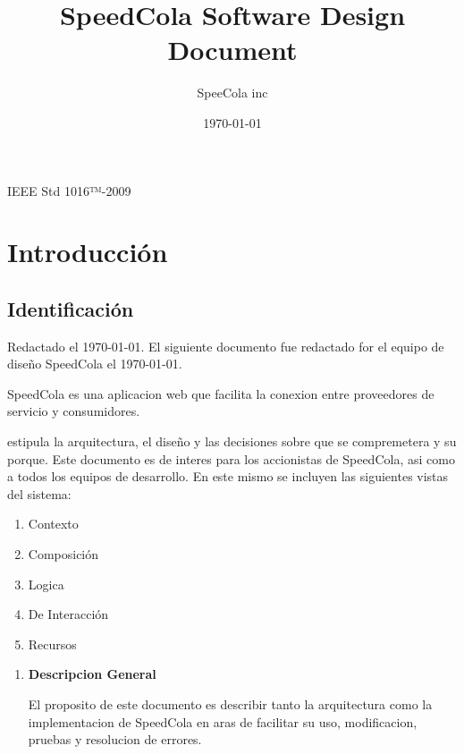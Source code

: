 \documentclass{article}
\title{SpeedCola Software Design Document}
\date{\today}%
\author{SpeeCola inc}%
\begin{document}
\maketitle
IEEE Std 1016™-2009

\newpage
{}

\section{Introducci\'on}
  \subsection{Identificaci\'on}
  Redactado el \today.
  El siguiente documento fue redactado for el equipo de dise\~no SpeedCola el \today . 

  SpeedCola es una aplicacion web que facilita la conexion entre proveedores de servicio y consumidores.

  estipula la arquitectura, el dise\~no y 
    las decisiones sobre que se compremetera y su porque. Este documento es de interes para los accionistas de SpeedCola, asi como a todos los equipos de desarrollo. 
    En este mismo se incluyen las siguientes vistas del sistema:
    \begin{multicols}{2}
    \begin{enumerate}

      \item Contexto
      \item Composici\'on 
      \item Logica
      \item De Interacci\'on
      \item Recursos

    \end{enumerate}
  \end{multicols}

  \begin{enumerate}
    \item  \textbf{Descripcion General}

  El proposito de este documento es describir tanto la arquitectura como la implementacion de 
  SpeedCola en aras de facilitar su uso, modificacion, pruebas y resolucion de errores.



  \end{enumerate}
\end{document}
